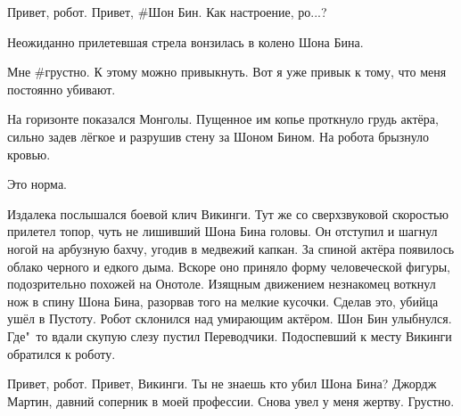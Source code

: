 {\footnotesize \begin{dialog}
\X Привет, робот.
\R Привет, \#Шон Бин.
\X Как настроение, ро...?
\end{dialog}

\begin{monolog}
Неожиданно прилетевшая стрела вонзилась в колено Шона Бина.
\end{monolog}

\begin{dialog}
\R Мне \#грустно.
\X К этому можно привыкнуть. Вот я уже привык к тому, что меня постоянно убивают.
\end{dialog}

\begin{monolog}
На горизонте показался Монголы. Пущенное им копье проткнуло грудь актёра, сильно задев лёгкое и разрушив стену за Шоном Бином. На робота брызнуло кровью.
\end{monolog}

\begin{dialog}
\X Это норма.
\end{dialog}

\begin{monolog}
Издалека послышался боевой клич Викинги. Тут же со сверхзвуковой скоростью прилетел топор, чуть не лишивший Шона Бина головы. Он отступил и шагнул ногой на арбузную бахчу, угодив в медвежий капкан. За спиной актёра появилось облако черного и едкого дыма. Вскоре оно приняло форму человеческой фигуры, подозрительно похожей на Онотоле. Изящным движением незнакомец воткнул нож в спину Шона Бина, разорвав того на мелкие кусочки. Сделав это, убийца ушёл в Пустоту. Робот склонился над умирающим актёром. Шон Бин улыбнулся. Где"~то вдали скупую слезу пустил Переводчики. Подоспевший к месту Викинги обратился к роботу.
\end{monolog}

\begin{dialog}
\X Привет, робот.
\R Привет, Викинги. Ты не знаешь кто убил Шона Бина?
\X Джордж Мартин, давний соперник в моей профессии. Снова увел у меня жертву.
\R Грустно.
\end{dialog}}